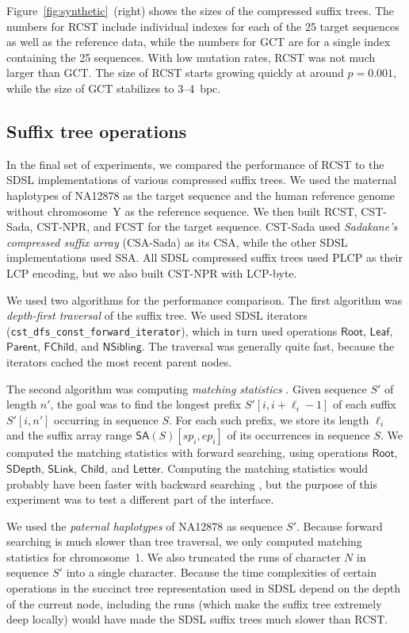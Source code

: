 \documentclass[a4paper,11pt]{llncs}
\newcommand{\CSTsada}{\textsf{CST\nobreakdash-Sada}}
\newcommand{\GCT}{\textsf{GCT}}
\newcommand{\FCST}{\textsf{FCST}}
\newcommand{\CSTnpr}{\textsf{CST\nobreakdash-NPR}}
\newcommand{\RCST}{\textsf{RCST}}
\newcommand{\CSA}{\textsf{CSA}}
\newcommand{\SSA}{\textsf{SSA}}
\newcommand{\CSAsada}{\textsf{CSA-Sada}}
\newcommand{\mSA}{\ensuremath{\mathsf{SA}}}
\newcommand{\LCP}{\textsf{LCP}}
\newcommand{\PLCP}{\textsf{PLCP}}
\newcommand{\LCPbyte}{\textsf{LCP\nobreakdash-byte}}
\newcommand{\mRoot}{\ensuremath{\mathsf{Root}}}
\newcommand{\mLeaf}{\ensuremath{\mathsf{Leaf}}}
\newcommand{\mParent}{\ensuremath{\mathsf{Parent}}}
\newcommand{\mFChild}{\ensuremath{\mathsf{FChild}}}
\newcommand{\mNSibling}{\ensuremath{\mathsf{NSibling}}}
\newcommand{\mSDepth}{\ensuremath{\mathsf{SDepth}}}
\newcommand{\mSLink}{\ensuremath{\mathsf{SLink}}}
\newcommand{\mChild}{\ensuremath{\mathsf{Child}}}
\newcommand{\mLetter}{\ensuremath{\mathsf{Letter}}}
\begin{document}
Figure~\ref{fig:synthetic}~(right) shows the sizes of the compressed suffix trees. The numbers for \RCST{} include individual indexes for each of the 25 target sequences as well as the reference data, while the numbers for \GCT{} are for a single index containing the 25 sequences. With low mutation rates, \RCST{} was not much larger than \GCT{}. The size of \RCST{} starts growing quickly at around $p = 0.001$, while the size of \GCT{} stabilizes to 3\nobreakdash--4~bpc.

\subsection{Suffix tree operations}

In the final set of experiments, we compared the performance of \RCST{} to the SDSL implementations of various compressed suffix trees. We used the maternal haplotypes of NA12878 as the target sequence and the human reference genome without chromosome~Y as the reference sequence. We then built \RCST, \CSTsada, \CSTnpr, and \FCST{} for the target sequence. \CSTsada{} used \emph{Sadakane's compressed suffix array} (\CSAsada) \cite{Sadakane2003} as its \CSA, while the other SDSL implementations used \SSA. All SDSL compressed suffix trees used \PLCP{} as their \LCP{} encoding, but we also built \CSTnpr{} with \LCPbyte.

We used two algorithms for the performance comparison. The first algorithm was \emph{depth-first traversal} of the suffix tree. We used SDSL iterators (\texttt{cst\_dfs\_const\_forward\_iterator}), which in turn used operations $\mRoot$, $\mLeaf$, $\mParent$, $\mFChild$, and $\mNSibling$. The traversal was generally quite fast, because the iterators cached the most recent parent nodes.

The second algorithm was computing \emph{matching statistics} \cite{Chang1994}. Given sequence $S'$ of length $n'$, the goal was to find the longest prefix $S'[i,i+\ell_{i}-1]$ of each suffix $S'[i,n']$ occurring in sequence $S$. For each such prefix, we store its length $\ell_{i}$ and the suffix array range $\mSA(S)[sp_{i},ep_{i}]$ of its occurrences in sequence $S$. We computed the matching statistics with forward searching, using operations $\mRoot$, $\mSDepth$, $\mSLink$, $\mChild$, and $\mLetter$. Computing the matching statistics would probably have been faster with backward searching \cite{Ohlebusch2010a}, but the purpose of this experiment was to test a different part of the interface.

We used the \emph{paternal haplotypes} of NA12878 as sequence $S'$. Because forward searching is much slower than tree traversal, we only computed matching statistics for chromosome~1. We also truncated the runs of character $N$ in sequence $S'$ into a single character. Because the time complexities of certain operations in the succinct tree representation used in SDSL depend on the depth of the current node, including the runs (which make the suffix tree extremely deep locally) would have made the SDSL suffix trees much slower than \RCST.
\end{document}
